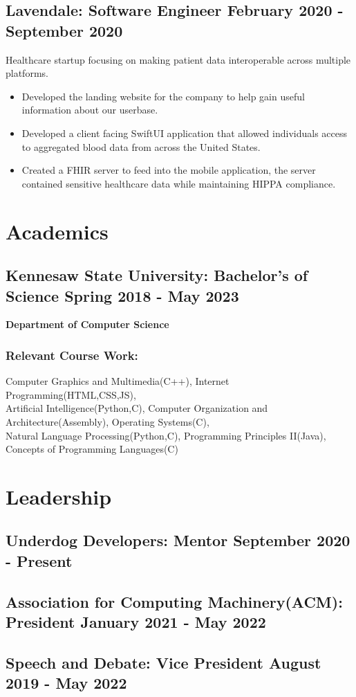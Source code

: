 \documentclass{article}
\begin{document}
\subsection{\large{Lavendale}: Software Engineer \hfill \small{February 2020 - September 2020}}
Healthcare startup focusing on making patient data interoperable across multiple platforms.
\begin{itemize}
\setlength\itemsep{.1em}
	\item  Developed  the landing website for the company to help gain useful information about our userbase. 
	\item Developed a client facing SwiftUI application that allowed individuals access to aggregated blood data from across the United States. 
	\item Created a FHIR server to feed into the mobile application, the server contained sensitive healthcare data while maintaining HIPPA compliance.
\end{itemize}
\section{Academics}
\subsection{\large Kennesaw State University: Bachelor's of Science  \hfill \small Spring 2018 - May 2023}
\textbf{Department of Computer Science}
\subsubsection{Relevant Course Work:} Computer Graphics and Multimedia(C++), Internet Programming(HTML,CSS,JS),\\Artificial Intelligence(Python,C), Computer Organization and Architecture(Assembly), Operating Systems(C), \\Natural Language Processing(Python,C), Programming Principles II(Java), Concepts of Programming Languages(C)
\section{Leadership}
\subsection{\large Underdog Developers: Mentor \hfill \small September 2020 - Present}
\subsection{\large Association for Computing Machinery(ACM): President \hfill \small January 2021 - May 2022}
\subsection{\large Speech and Debate: Vice President \hfill \small August 2019 - May 2022}
\end{document}
